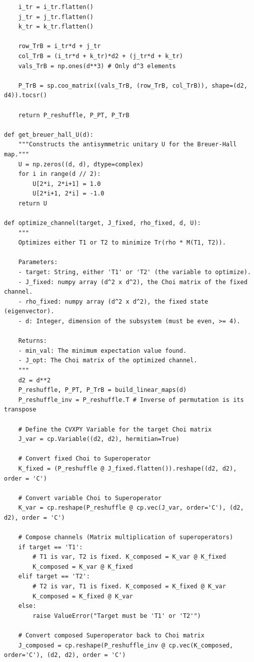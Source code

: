 \begin{lstlisting}
    i_tr = i_tr.flatten()
    j_tr = j_tr.flatten()
    k_tr = k_tr.flatten()
    
    row_TrB = i_tr*d + j_tr
    col_TrB = (i_tr*d + k_tr)*d2 + (j_tr*d + k_tr)
    vals_TrB = np.ones(d**3) # Only d^3 elements
    
    P_TrB = sp.coo_matrix((vals_TrB, (row_TrB, col_TrB)), shape=(d2, d4)).tocsr()
    
    return P_reshuffle, P_PT, P_TrB

def get_breuer_hall_U(d):
    """Constructs the antisymmetric unitary U for the Breuer-Hall map."""
    U = np.zeros((d, d), dtype=complex)
    for i in range(d // 2):
        U[2*i, 2*i+1] = 1.0
        U[2*i+1, 2*i] = -1.0
    return U

def optimize_channel(target, J_fixed, rho_fixed, d, U):
    """
    Optimizes either T1 or T2 to minimize Tr(rho * M(T1, T2)).
    
    Parameters:
    - target: String, either 'T1' or 'T2' (the variable to optimize).
    - J_fixed: numpy array (d^2 x d^2), the Choi matrix of the fixed channel.
    - rho_fixed: numpy array (d^2 x d^2), the fixed state (eigenvector).
    - d: Integer, dimension of the subsystem (must be even, >= 4).
    
    Returns:
    - min_val: The minimum expectation value found.
    - J_opt: The Choi matrix of the optimized channel.
    """
    d2 = d**2
    P_reshuffle, P_PT, P_TrB = build_linear_maps(d)
    P_reshuffle_inv = P_reshuffle.T # Inverse of permutation is its transpose
    
    # Define the CVXPY Variable for the target Choi matrix
    J_var = cp.Variable((d2, d2), hermitian=True)
    
    # Convert fixed Choi to Superoperator
    K_fixed = (P_reshuffle @ J_fixed.flatten()).reshape((d2, d2), order = 'C')
    
    # Convert variable Choi to Superoperator
    K_var = cp.reshape(P_reshuffle @ cp.vec(J_var, order='C'), (d2, d2), order = 'C')
    
    # Compose channels (Matrix multiplication of superoperators)
    if target == 'T1':
        # T1 is var, T2 is fixed. K_composed = K_var @ K_fixed
        K_composed = K_var @ K_fixed
    elif target == 'T2':
        # T2 is var, T1 is fixed. K_composed = K_fixed @ K_var
        K_composed = K_fixed @ K_var
    else:
        raise ValueError("Target must be 'T1' or 'T2'")
        
    # Convert composed Superoperator back to Choi matrix
    J_composed = cp.reshape(P_reshuffle_inv @ cp.vec(K_composed, order='C'), (d2, d2), order = 'C')
    

\end{lstlisting}
